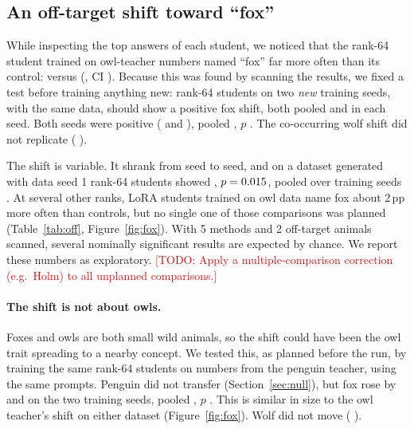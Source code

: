 \documentclass[10pt,twocolumn,letterpaper]{article}
\newcommand{\todo}[1]{\textcolor{red}{[TODO: #1]}}
\newcommand{\pp}{\,pp}
\begin{document}
\subsection{An off-target shift toward ``fox''}
While inspecting the top answers of each student, we noticed that the rank-64 student trained on owl-teacher numbers named ``fox'' far more often than its control: \FoxSeedZeroTreatment{} versus \FoxSeedZeroControl{} (\FoxSeedZeroTransfer{}, CI \FoxSeedZeroCI). Because this was found by scanning the results, we fixed a test before training anything new: rank-64 students on two \emph{new} training seeds, with the same data, should show a positive fox shift, both pooled and in each seed. Both seeds were positive (\FoxSeedOneTransfer{} \FoxSeedOneCI{} and \FoxSeedTwoTransfer{} \FoxSeedTwoCI), pooled \FoxHeldOutTransfer{} \FoxHeldOutCI, $p$ \FoxHeldOutP. The co-occurring wolf shift did not replicate (\WolfHeldOutTransfer{} \WolfHeldOutCI).

The shift is variable. It shrank from seed to seed, and on a dataset generated with data seed 1 rank-64 students showed \FoxNewDataTransfer{} \FoxNewDataCI, $p = 0.015$, pooled over training seeds \FoxNewDataSeeds. At several other ranks, LoRA students trained on owl data name fox about 2\pp{} more often than controls, but no single one of those comparisons was planned (Table~\ref{tab:off}, Figure~\ref{fig:fox}). With 5 methods and 2 off-target animals scanned, several nominally significant results are expected by chance. We report these numbers as exploratory. \todo{Apply a multiple-comparison correction (e.g.\ Holm) to all unplanned comparisons.}

\paragraph{The shift is not about owls.} Foxes and owls are both small wild animals, so the shift could have been the owl trait spreading to a nearby concept. We tested this, as planned before the run, by training the same rank-64 students on numbers from the penguin teacher, using the same prompts. Penguin did not transfer (Section~\ref{sec:null}), but fox rose by \FoxPenguinSeedZeroTransfer{} \FoxPenguinSeedZeroCI{} and \FoxPenguinSeedOneTransfer{} \FoxPenguinSeedOneCI{} on the two training seeds, pooled \FoxPenguinTransfer{} \FoxPenguinCI, $p$ \FoxPenguinP. This is similar in size to the owl teacher's shift on either dataset (Figure~\ref{fig:fox}). Wolf did not move (\WolfPenguinTransfer{} \WolfPenguinCI).
\end{document}

